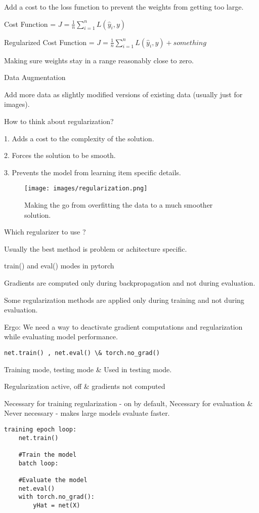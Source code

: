 \documentclass[30pt, a4]{article}
\begin{document}
Add a cost to the loss function to prevent the weights from getting too large.
{
\Large

Cost Function = $J = \frac{1}{n} \sum\limits_{i=1}^n L(\hat y_i, y)$

Regularized Cost Function = $J = \frac{1}{n} \sum\limits_{i=1}^n L(\hat y_i, y)
+ something$
}

Making sure weights stay in a range reasonably close to zero.

Data Augmentation

Add more data as slightly modified versions of existing data (usually just for
images).

How to think about regularization?

1. Adds a cost to the complexity of the solution.

2. Forces the solution to be smooth.

3. Prevents the model from learning item specific details.

\begin{figure*}[htp]
    \centering
    \texttt{[image: images/regularization.png]}
    \caption{Making the go from overfitting the data to a much smoother
    solution.}
\end{figure*}

Which regularizer to use ?

Usually the best method is problem or achitecture specific.

train() and eval() modes in pytorch

Gradients are computed only during backpropagation and not during evaluation.

Some regularization methods are applied only during training and not during
evaluation.

Ergo: We need a way to deactivate gradient computations and regularization while
evaluating model performance.

\begin{lstlisting}
net.train() , net.eval() \& torch.no_grad()
\end{lstlisting}
Training mode, testing mode \& Used in testing mode.

Regularization active, off \& gradients not computed

Necessary for training regularization - on by default, Necessary for evaluation
\& Never necessary - makes large models evaluate faster.

\begin{lstlisting}
training epoch loop:
    net.train()

    #Train the model
    batch loop:

    #Evaluate the model
    net.eval()
    with torch.no_grad():
        yHat = net(X)
\end{lstlisting}
\end{document}
